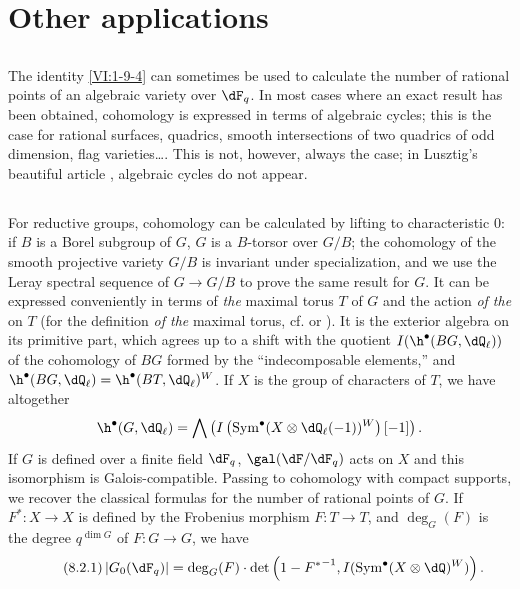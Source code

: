 \section{Other applications}\label{VI:8}





\subsection{}\label{VI:8-1}

The identity \ref{VI:1-9-4} can sometimes be used to calculate 
the number of rational points of an algebraic variety over $\dF_q$. In 
most cases where an exact result has been obtained, cohomology 
is expressed in terms of algebraic cycles; this is the case for rational 
surfaces, quadrics, smooth intersections of two quadrics of 
odd dimension, flag varieties\ldots. This is not, however, 
always the case; in Lusztig's beautiful article , algebraic cycles 
do not appear. 





\subsection{}\label{VI:8-2}

For reductive groups, cohomology can be calculated by lifting to 
characteristic $0$: if $B$ is a Borel subgroup of $G$, $G$ is a 
$B$-torsor over $G/B$; the cohomology of the smooth projective variety 
$G/B$ is invariant under specialization, and we use the Leray spectral sequence 
of $G\to G/B$ to prove the same result for $G$. It can be expressed 
conveniently in terms of \emph{the} maximal torus $T$ of $G$ and the action 
\emph{of the}  on $T$ (for the definition \emph{of the} maximal 
torus, cf.  or \cite[p.105]{dl76}). It is 
the exterior algebra on its primitive part, which agrees up to a shift 
with the quotient $I(\h^\bullet(B G,\dQ_\ell))$ of the cohomology of 
$B G$ formed by the ``indecomposable elements,'' and 
$\h^\bullet(B G,\dQ_\ell)=\h^\bullet(B T,\dQ_\ell)^W$. If $X$ is the group of 
characters of $T$, we have altogether 
\[
  \h^\bullet(G,\dQ_\ell) = \bigwedge \left(I\left(\operatorname{Sym}^\bullet(X\otimes \dQ_\ell(-1))^W\right)[-1]\right) \text{.}
\]
If $G$ is defined over a finite field $\dF_q$, $\gal(\dF/\dF_q)$ acts on $X$ 
and this isomorphism is Galois-compatible. Passing to 
cohomology with compact supports, we recover the classical formulas for the 
number of rational points of $G$. If $F^\ast:X\to X$ is defined by the 
Frobenius morphism $F:T\to T$, and $\deg_G(F)$ is the degree 
$q^{\dim G}$ of $F:G\to G$, we have 
\begin{equation*}\tag{8.2.1}\label{VI:eq:8-2-1}
  \left|G_0(\dF_q)\right| = \deg_G(F) \cdot \det\left(1-{F^\ast}^{-1},I(\operatorname{Sym}^\bullet(X\otimes \dQ)^W)\right) \text{.}
\end{equation*}

